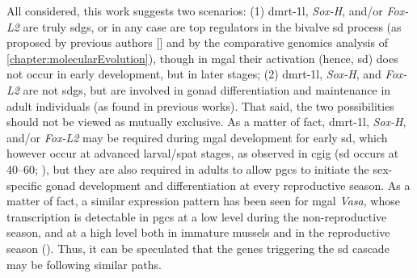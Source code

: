 All considered, this work suggests two scenarios: (1) \gls{dmrt-1l}, \textit{Sox-H}, and/or \textit{Fox-L2} are truly \glspl{sdg}, or in any case are top regulators in the bivalve \gls{sd} process (as proposed by previous authors [] and by the comparative genomics analysis of \cref{chapter:molecularEvolution}), though in \gls{mgal} their activation (hence, \gls{sd}) does not occur in early development, but in later stages; (2) \gls{dmrt-1l}, \textit{Sox-H}, and \textit{Fox-L2} are not \glspl{sdg}, but are involved in gonad differentiation and maintenance in adult individuals (as found in previous works). That said, the two possibilities should not be viewed as mutually exclusive. As a matter of fact, \gls{dmrt-1l}, \textit{Sox-H}, and/or \textit{Fox-L2} may be required during \gls{mgal} development for early \gls{sd}, which however occur at advanced larval/spat stages, as observed in \gls{cgig} (\gls{sd} occurs at \qtyrange{40}{60}{\dpf}; ), but they are also required in adults to allow \glspl{pgc} to initiate the sex-specific gonad development and differentiation at every reproductive season. As a matter of fact, a similar expression pattern has been seen for \gls{mgal} \textit{Vasa}, whose transcription is detectable in \glspl{pgc} at a low level during the non-reproductive season, and at a high level both in immature mussels and in the reproductive season (). Thus, it can be speculated that the genes triggering the \gls{sd} cascade may be following similar paths.

